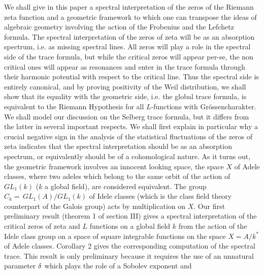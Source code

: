


\vglue 1cm
\eject
{}
\smallskip
We shall give in this paper a spectral interpretation of the zeros of 
the Riemann zeta function and a geometric framework to which one can 
transpose the ideas of algebraic geometry involving the action of the 
Frobenius and the Lefchetz formula. The spectral interpretation of the 
zeros of zeta will be as an absorption spectrum, i.e. as missing 
spectral lines. All zeros will play a role in the spectral side of the 
trace formula, but while the critical zeros will appear per-se, the non 
critical ones will appear as resonances and 
enter in the trace formula through their harmonic potential with respect 
to the critical line. Thus the spectral side is entirely canonical, and 
by proving positivity of the Weil distribution, we shall show that its 
equality with the geometric side, i.e. the global trace formula, is 
equivalent to the Riemann Hypothesis for all $L$-functions with 
Gr\"ossencharakter. We shall model our discussion on the Selberg trace 
formula, but it differs from the latter in several important respects. 
We shall first explain in particular why a crucial negative sign in the 
analysis of the statistical fluctuations of the zeros of zeta indicates 
that the spectral interpretation should be as an absorption spectrum, or 
equivalently should be of a cohomological nature. As it turns out, the 
geometric framework involves an innocent looking space, the space $X$ of 
Adele classes, where two adeles which belong to the same orbit of the 
action of $GL_1(k)$ ($k$ a global field), are considered equivalent. The 
group $C_k= \,GL_1(A)/GL_1(k)$ of Idele classes (which is the class 
field theory counterpart of the Galois group) acts by multiplication on 
$X$.
\smallskip
 Our first preliminary result (theorem 1 of section III) gives a 
spectral interpretation of the critical 
zeros of zeta and $L$ functions on a global field $k$ from the action of 
the Idele class group on a space of square integrable functions on
the space $X = A/k^*$ of Adele classes. Corollary 2 gives the 
corresponding computation of the spectral trace.
This result is only preliminary because it requires the use of an 
unnatural parameter $\delta$ which plays the role of a Sobolev exponent and 
